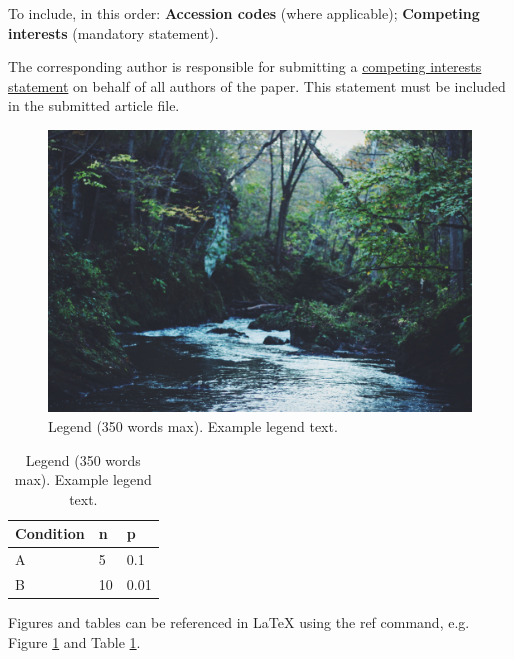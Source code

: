 \documentclass[fleqn,10pt]{wlscirep}
\begin{document}
To include, in this order: \textbf{Accession codes} (where applicable); \textbf{Competing interests} (mandatory statement). 

The corresponding author is responsible for submitting a \href{http://www.nature.com/srep/policies/index.html#competing}{competing interests statement} on behalf of all authors of the paper. This statement must be included in the submitted article file.

\begin{figure}[ht]
\centering
\includegraphics[width=\linewidth]{stream}
\caption{Legend (350 words max). Example legend text.}
\label{fig:stream}
\end{figure}

\begin{table}[ht]
\centering
\begin{tabular}{|l|l|l|}
\hline
Condition & n & p \\
\hline
A & 5 & 0.1 \\
\hline
B & 10 & 0.01 \\
\hline
\end{tabular}
\caption{\label{tab:example}Legend (350 words max). Example legend text.}
\end{table}

Figures and tables can be referenced in LaTeX using the ref command, e.g. Figure \ref{fig:stream} and Table \ref{tab:example}.
\end{document}
